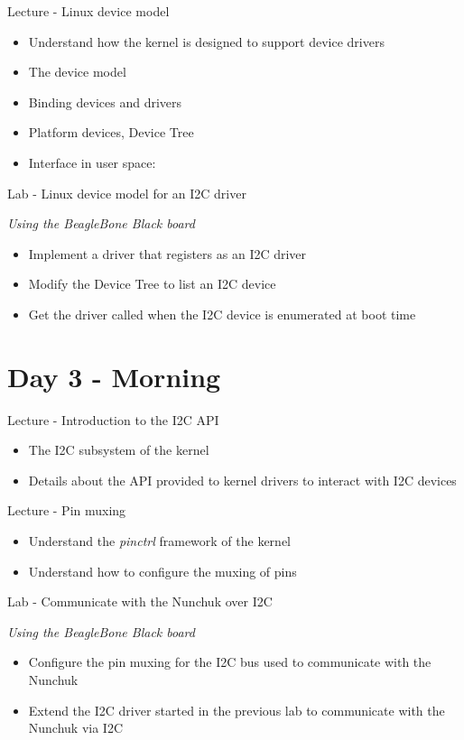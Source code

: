 \documentclass[a4paper,12pt,obeyspaces,spaces,hyphens]{article}
\begin{document}
\feagendatwocolumn
{Lecture - Linux device model}
{
  \begin{itemize}
  \item Understand how the kernel is designed to support device
    drivers
  \item The device model
  \item Binding devices and drivers
  \item Platform devices, Device Tree
  \item Interface in user space: 
  \end{itemize}
}
{Lab - Linux device model for an I2C driver}
{
  {\em Using the BeagleBone Black board}
  \begin{itemize}
  \item Implement a driver that registers as an I2C driver
  \item Modify the Device Tree to list an I2C device
  \item Get the driver called when the I2C device is enumerated at
    boot time
  \end{itemize}
}

\section{Day 3 - Morning}

\feagendatwocolumn
{Lecture - Introduction to the I2C API}
{
  \begin{itemize}
  \item The I2C subsystem of the kernel
  \item Details about the API provided to kernel drivers to interact
    with I2C devices
  \end{itemize}
}
{Lecture - Pin muxing}
{
  \begin{itemize}
  \item Understand the {\em pinctrl} framework of the kernel
  \item Understand how to configure the muxing of pins
  \end{itemize}
}

\feagendaonecolumn
{Lab - Communicate with the Nunchuk over I2C}
{
  {\em Using the BeagleBone Black board}
  \begin{itemize}
  \item Configure the pin muxing for the I2C bus used to communicate
    with the Nunchuk
  \item Extend the I2C driver started in the previous lab to
    communicate with the Nunchuk via I2C
  \end{itemize}
}
\end{document}
